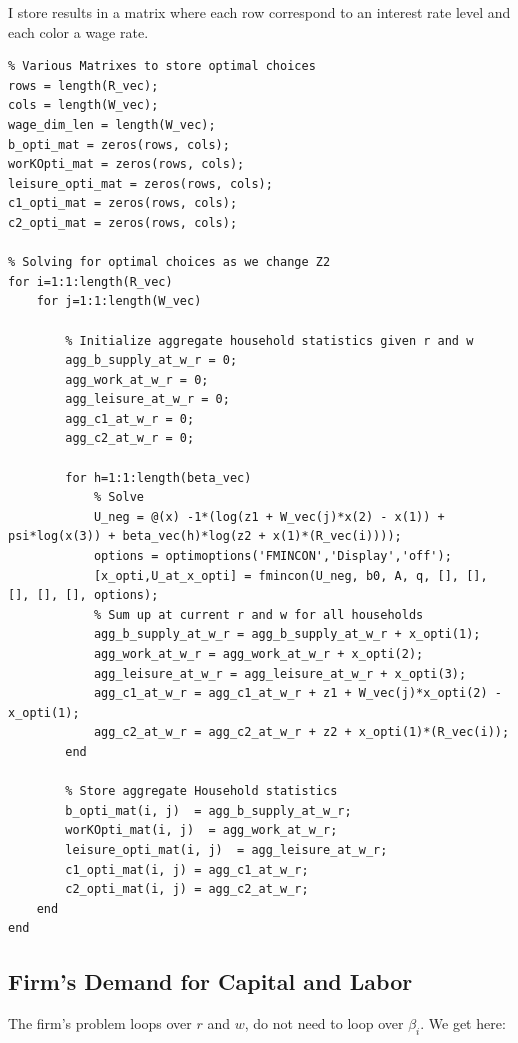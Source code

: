 \documentclass[
]{book}
\begin{document}
I store results in a matrix where each row correspond to an interest
rate level and each color a wage rate.

\begin{verbatim}
% Various Matrixes to store optimal choices
rows = length(R_vec);
cols = length(W_vec);
wage_dim_len = length(W_vec);
b_opti_mat = zeros(rows, cols);
worKOpti_mat = zeros(rows, cols);
leisure_opti_mat = zeros(rows, cols);
c1_opti_mat = zeros(rows, cols);
c2_opti_mat = zeros(rows, cols);

% Solving for optimal choices as we change Z2
for i=1:1:length(R_vec)
    for j=1:1:length(W_vec)
        
        % Initialize aggregate household statistics given r and w
        agg_b_supply_at_w_r = 0;
        agg_work_at_w_r = 0;
        agg_leisure_at_w_r = 0;
        agg_c1_at_w_r = 0;
        agg_c2_at_w_r = 0;
        
        for h=1:1:length(beta_vec)
            % Solve
            U_neg = @(x) -1*(log(z1 + W_vec(j)*x(2) - x(1)) + psi*log(x(3)) + beta_vec(h)*log(z2 + x(1)*(R_vec(i))));
            options = optimoptions('FMINCON','Display','off');
            [x_opti,U_at_x_opti] = fmincon(U_neg, b0, A, q, [], [], [], [], [], options);
            % Sum up at current r and w for all households
            agg_b_supply_at_w_r = agg_b_supply_at_w_r + x_opti(1);
            agg_work_at_w_r = agg_work_at_w_r + x_opti(2);
            agg_leisure_at_w_r = agg_leisure_at_w_r + x_opti(3);
            agg_c1_at_w_r = agg_c1_at_w_r + z1 + W_vec(j)*x_opti(2) - x_opti(1);
            agg_c2_at_w_r = agg_c2_at_w_r + z2 + x_opti(1)*(R_vec(i));
        end
        
        % Store aggregate Household statistics
        b_opti_mat(i, j)  = agg_b_supply_at_w_r;
        worKOpti_mat(i, j)  = agg_work_at_w_r;
        leisure_opti_mat(i, j)  = agg_leisure_at_w_r;
        c1_opti_mat(i, j) = agg_c1_at_w_r;
        c2_opti_mat(i, j) = agg_c2_at_w_r;
    end
end
\end{verbatim}

\hypertarget{firms-demand-for-capital-and-labor}{%
\subsection{Firm's Demand for Capital and Labor}\label{firms-demand-for-capital-and-labor}}

The firm's problem loops over \(r\) and \(w\), do not need to loop over
\(\beta_i\). We get here:
\end{document}
